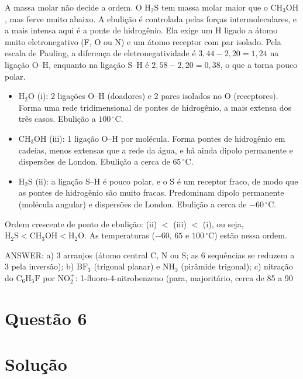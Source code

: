 \documentclass{article}%
\begin{document}
\noindent A massa molar não decide a ordem. O $\text{H}_2\text{S}$ tem massa molar maior que o $\text{CH}_3\text{OH}$, mas ferve muito abaixo. A ebulição é controlada pelas forças intermoleculares, e a mais intensa aqui é a ponte de hidrogênio. Ela exige um H ligado a átomo muito eletronegativo (F, O ou N) e um átomo receptor com par isolado. Pela escala de Pauling, a diferença de eletronegatividade é $3{,}44-2{,}20=1{,}24$ na ligação O–H, enquanto na ligação S–H é $2{,}58-2{,}20=0{,}38$, o que a torna pouco polar.
\begin{itemize}
\item $\text{H}_2\text{O}$ (i): 2 ligações O–H (doadores) e 2 pares isolados no O (receptores). Forma uma rede tridimensional de pontes de hidrogênio, a mais extensa dos três casos. Ebulição a $100\,^\circ\text{C}$.
\item $\text{CH}_3\text{OH}$ (iii): 1 ligação O–H por molécula. Forma pontes de hidrogênio em cadeias, menos extensas que a rede da água, e há ainda dipolo permanente e dispersões de London. Ebulição a cerca de $65\,^\circ\text{C}$.
\item $\text{H}_2\text{S}$ (ii): a ligação S–H é pouco polar, e o S é um receptor fraco, de modo que as pontes de hidrogênio são muito fracas. Predominam dipolo permanente (molécula angular) e dispersões de London. Ebulição a cerca de $-60\,^\circ\text{C}$.
\end{itemize}

\noindent Ordem crescente de ponto de ebulição: (ii) $<$ (iii) $<$ (i), ou seja, $\text{H}_2\text{S}<\text{CH}_3\text{OH}<\text{H}_2\text{O}$. As temperaturas ($-60$, $65$ e $100\,^\circ\text{C}$) estão nessa ordem.

\medskip
\noindent ANSWER: a) 3 arranjos (átomo central C, N ou S; as 6 sequências se reduzem a 3 pela inversão); b) $\text{BF}_3$ (trigonal planar) e $\text{NH}_3$ (pirâmide trigonal); c) nitração do $\text{C}_6\text{H}_5\text{F}$ por $\text{NO}_2^{+}$: 1-fluoro-4-nitrobenzeno (para, majoritário, cerca de 85 a 90 %
\newpage%
\section*{Questão 6}

\section*{Solução}
\end{document}
